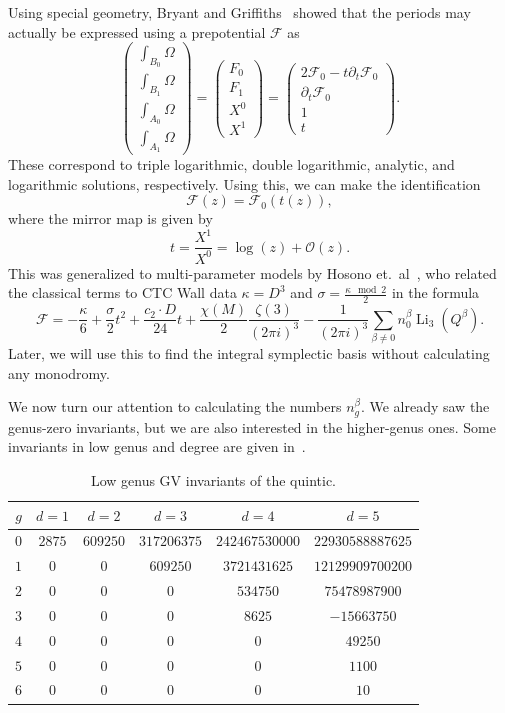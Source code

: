 \documentclass[10pt,oldfontcommands,oneside]{memoir}
\theoremstyle{definition}
\theoremstyle{remark}
\theoremstyle{plain}
\theoremstyle{definition}
\theoremstyle{remark}
\newcommand{\mc}[1]{\mathcal{#1}}
\newcommand{\on}[1]{\operatorname{#1}}
\newcommand{\1}{\mathbf{1}}
\newcommand{\2}{\mathbf{2}}
\newcommand{\3}{\mathbf{3}}
\begin{document}
Using special geometry, Bryant and Griffiths~\cite{bryantgriffiths} showed that the periods may actually be expressed using a prepotential $\mc{F}$ as
\[ \begin{pmatrix}
    \int_{B_0} \Omega \\
    \int_{B_1} \Omega \\
    \int_{A_0} \Omega \\
    \int_{A_1} \Omega
\end{pmatrix} = \begin{pmatrix}
    F_0 \\
    F_1 \\
    X^0 \\
    X^1 
\end{pmatrix} = \begin{pmatrix}
    2 \mc{F}_0 - t \partial_t \mc{F}_0 \\
    \partial_t \mc{F}_0 \\
    1 \\ 
    t
\end{pmatrix}.
\]
These correspond to triple logarithmic, double logarithmic, analytic, and logarithmic solutions, respectively. Using this, we can make the identification
\[ \mc{F}(z) = \mc{F}_0(t(z)), \]
where the mirror map is given by
\[ t = \frac{X^1}{X^0} = \log(z) + \mc{O}(z). \]
This was generalized to multi-parameter models by Hosono et.~al~\cite{mirrormultiparam}, who related the classical terms to CTC Wall data $\kappa = D^3$ and $\sigma = \frac{\kappa \mod{2}}{2}$ in the formula
\[ \mc{F} = - \frac{\kappa}{6} + \frac{\sigma}{2}t^2 + \frac{c_2 \cdot D}{24}t + \frac{\chi(M)}{2} \frac{\zeta(3)}{(2\pi i)^3} - \frac{1}{(2\pi i)^3}\sum_{\beta \neq 0} n_0^{\beta} \on{Li}_3(Q^{\beta}). \]
Later, we will use this to find the integral symplectic basis without calculating any monodromy.

We now turn our attention to calculating the numbers $n_g^{\beta}$. We already saw the genus-zero invariants, but we are also interested in the higher-genus ones. Some invariants in low genus and degree are given in~.
\begin{table}[htpb]
    \centering
    \caption{Low genus GV invariants of the quintic.}
    \label{tab:g0gvquintic}
    \begin{tabular}{cccccc}
        \toprule
        $g$ & $d=1$ & $d=2$ & $d=3$ & $d=4$ & $d=5$ \\
        \midrule
        $0$ & $2875$ & $609250$ & $317206375$ & $242467530000$ & $22930588887625$ \\
        $1$ & $0$ & $0$ & $609250$ & $3721431625$ & $12129909700200$ \\
        $2$ & $0$ & $0$ & $0$ & $534750$ & $75478987900$ \\
        $3$ & $0$ & $0$ & $0$ & $8625$ & $-15663750$ \\
        $4$ & $0$ & $0$ & $0$ & $0$ & $49250$ \\
        $5$ & $0$ & $0$ & $0$ & $0$ & $1100$ \\
        $6$ & $0$ & $0$ & $0$ & $0$ & $10$ \\
        \bottomrule
    \end{tabular}
\end{table}
\end{document}
